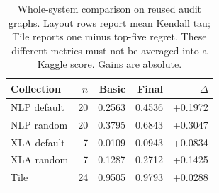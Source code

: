 \begin{table}[t]
\centering
\begin{tabular}{@{}lrrrr@{}}
\toprule
Collection & $n$ & Basic & Final & $\Delta$ \\
\midrule
NLP default & 20 & 0.2563 & 0.4536 & +0.1972 \\
NLP random & 20 & 0.3795 & 0.6843 & +0.3047 \\
XLA default & 7 & 0.0109 & 0.0943 & +0.0834 \\
XLA random & 7 & 0.1287 & 0.2712 & +0.1425 \\
Tile & 24 & 0.9505 & 0.9793 & +0.0288 \\
\bottomrule
\end{tabular}
\caption{Whole-system comparison on reused audit graphs. Layout rows report mean Kendall tau; Tile reports one minus top-five regret. These different metrics must not be averaged into a Kaggle score. Gains are absolute.}
\label{tab:final}
\end{table}
